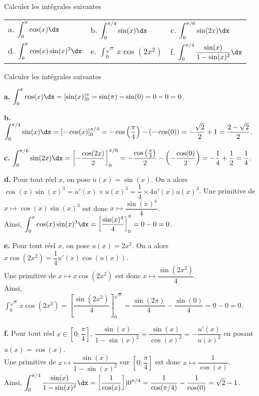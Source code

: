 \documentclass[11pt,fleqn, openany]{book} %
\begin{document}
\begin{exercise}[topic=trig02]Calculer les intégrales suivantes

\begin{tabularx}{\linewidth}{XXX}
a. $\displaystyle\int_0^{\pi} \cos(x)\dx$ & b. $\displaystyle\int_0^{\pi /4} \sin(x)\dx$ & c. $\displaystyle\int_0^{\pi / 6} \sin(2x)\dx$ \\
d. $\displaystyle\int_0^{\pi} \cos(x)\sin(x)^3\dx$ & e. $\displaystyle\int_0^{\sqrt{\pi}}x\cos(2x^2)$ & f. $\displaystyle\int_0^{\pi/4} \dfrac{\sin(x)}{1-\sin(x)^2}\dx$
\end{tabularx}

\end{exercise}


\begin{solution}Calculer les intégrales suivantes

\textbf{a.} $\displaystyle\int_0^{\pi} \cos(x)\dx = [\sin(x)]_0^{\pi}=\sin(\pi)-\sin(0)=0-0=0$.

\textbf{b.} $\displaystyle\int_0^{\pi /4} \sin(x)\dx = [-\cos(x)]_0^{\pi /4}=-\cos\left(\dfrac{\pi}{4}\right)-(-\cos(0))=-\dfrac{\sqrt{2}}{2}+1=\dfrac{2-\sqrt{2}}{2}$.

\textbf{c.} $\displaystyle\int_0^{\pi / 6} \sin(2x)\dx = \left[-\dfrac{\cos(2x)}{2}\right]_0^{\pi/6} = -\dfrac{\cos\left(\frac{\pi}{3}\right)}{2}-\left(-\dfrac{\cos(0)}{2}\right)=-\dfrac{1}{4}+\dfrac{1}{2}=\dfrac{1}{4}$.

\textbf{d.} Pour tout réel $x$, on pose $u(x)=\sin(x)$. On a alors $\cos(x)\sin(x)^3 = u'(x) \times u(x)^3 = \dfrac{1}{4} \times 4u'(x)u(x)^3$. Une primitive de $x\mapsto \cos(x)\sin(x)^3$ est donc $x\mapsto \dfrac{\sin(x)^4}{4}$. \\ Ainsi, $\displaystyle\int_0^{\pi} \cos(x)\sin(x)^3\dx = \left[\dfrac{\sin(x)^4}{4}\right]_0^{\pi}=0-0=0$.

\textbf{e.} Pour tout réel $x$, on pose $u(x)=2x^2$. On a alors $x\cos(2x^2) = \dfrac{1}{4}u'(x)\cos(u(x))$. \\Une primitive de $x\mapsto x\cos(2x^2)$ est donc $x\mapsto \dfrac{\sin(2x^2)}{4}$. \\ Ainsi, $\displaystyle\int_0^{\sqrt{\pi}}x\cos(2x^2) = \left[\dfrac{\sin(2x^2)}{4}\right]_0^{\sqrt{\pi}}= \dfrac{\sin(2\pi)}{4}-\dfrac{\sin(0)}{4}=0-0=0$.

\textbf{f.} Pour tout réel $x\in \left[0;\dfrac{\pi}{4}\right]$, $\dfrac{\sin(x)}{1-\sin(x)^2}=\dfrac{\sin(x)}{\cos(x)^2} = -\dfrac{u'(x)}{u(x)^2}$ en posant $u(x)=\cos(x)$. \\ Une primitive de $x\mapsto \dfrac{\sin(x)}{1-\sin(x)^2}$ sur $\left[0;\dfrac{\pi}{4}\right]$ est donc $x\mapsto \dfrac{1}{\cos(x)}$.\\ Ainsi, $\displaystyle\int_0^{\pi/4} \dfrac{\sin(x)}{1-\sin(x)^2}\dx=\left[\dfrac{1}{\cos(x)}\right])0^{\pi/4}=\dfrac{1}{\cos(\pi/4)}-\dfrac{1}{\cos(0)}=\sqrt{2}-1$.

\end{solution}
\end{document}

